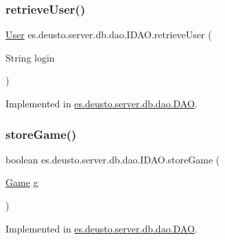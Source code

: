 \subsubsection{\texorpdfstring{retrieve\+User()}{retrieveUser()}}
{\footnotesize\ttfamily \hyperlink{classes_1_1deusto_1_1server_1_1db_1_1data_1_1_user}{User} es.\+deusto.\+server.\+db.\+dao.\+I\+D\+A\+O.\+retrieve\+User (\begin{DoxyParamCaption}\item[{String}]{login }\end{DoxyParamCaption})}



Implemented in \hyperlink{classes_1_1deusto_1_1server_1_1db_1_1dao_1_1_d_a_o_a8c316b4c3bf246d00fb2b423a603ebe6}{es.\+deusto.\+server.\+db.\+dao.\+D\+AO}.

\mbox{\label{interfacees_1_1deusto_1_1server_1_1db_1_1dao_1_1_i_d_a_o_ab38972c7c70c95b4c409fa7758ef2fc3}} 
\subsubsection{\texorpdfstring{store\+Game()}{storeGame()}}
{\footnotesize\ttfamily boolean es.\+deusto.\+server.\+db.\+dao.\+I\+D\+A\+O.\+store\+Game (\begin{DoxyParamCaption}\item[{\hyperlink{classes_1_1deusto_1_1server_1_1db_1_1data_1_1_game}{Game}}]{g }\end{DoxyParamCaption})}



Implemented in \hyperlink{classes_1_1deusto_1_1server_1_1db_1_1dao_1_1_d_a_o_a7484309d9b9b39c24cd7d0413a90c468}{es.\+deusto.\+server.\+db.\+dao.\+D\+AO}.

\mbox{\label{interfacees_1_1deusto_1_1server_1_1db_1_1dao_1_1_i_d_a_o_ab943216560f43595a852b406dcd394a4}} 
